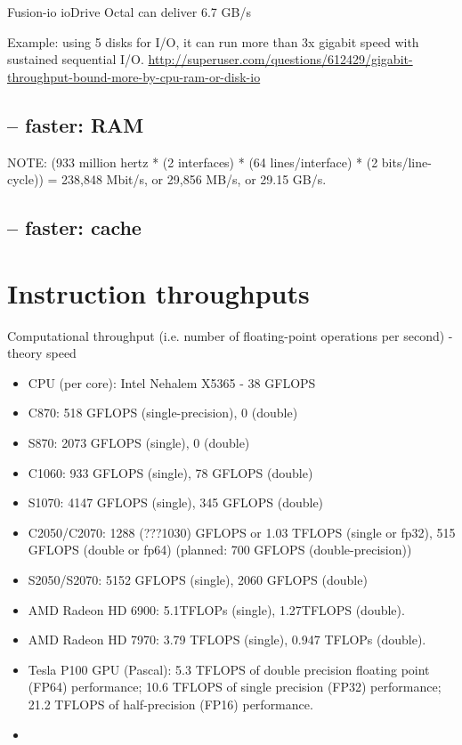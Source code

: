 Fusion-io ioDrive Octal can deliver 6.7 GB/s 



Example: using 5 disks for I/O, it can run more than 3x gigabit speed with
sustained sequential I/O.
\url{http://superuser.com/questions/612429/gigabit-throughput-bound-more-by-cpu-ram-or-disk-io}


\subsection{-- faster: RAM}


NOTE: (933 million hertz * (2 interfaces) * (64 lines/interface) * (2
bits/line-cycle)) = 238,848 Mbit/s, or 29,856 MB/s, or 29.15 GB/s. 

\subsection{-- faster: cache}



\section{Instruction throughputs}
\label{sec:instr-thro-1}

Computational throughput (i.e. number of floating-point operations per
second) - theory speed
  \begin{itemize}
  \item CPU (per core): Intel Nehalem X5365 - 38 GFLOPS
  \item C870: 518 GFLOPS (single-precision), 0 (double)
  \item S870: 2073 GFLOPS (single), 0 (double) 
  \item C1060: 933 GFLOPS (single), 78 GFLOPS
    (double)
  \item S1070: 4147 GFLOPS (single), 345 GFLOPS (double)
  \item C2050/C2070: 1288 (???1030) GFLOPS or 1.03 TFLOPS (single or
    fp32), 515 GFLOPS (double or fp64) (planned: 700 GFLOPS
    (double-precision))
  \item S2050/S2070: 5152 GFLOPS (single), 2060 GFLOPS (double)
  \item AMD Radeon HD 6900: 5.1TFLOPs (single), 1.27TFLOPS (double).
  \item AMD Radeon HD 7970: 3.79 TFLOPS (single), 0.947 TFLOPs (double).
  
  \item Tesla P100 GPU (Pascal): 5.3 TFLOPS of double precision floating point (FP64) performance;
	10.6 TFLOPS of single precision (FP32) performance; 21.2 TFLOPS of half-precision (FP16) performance.  

  \item 
  \end{itemize}

